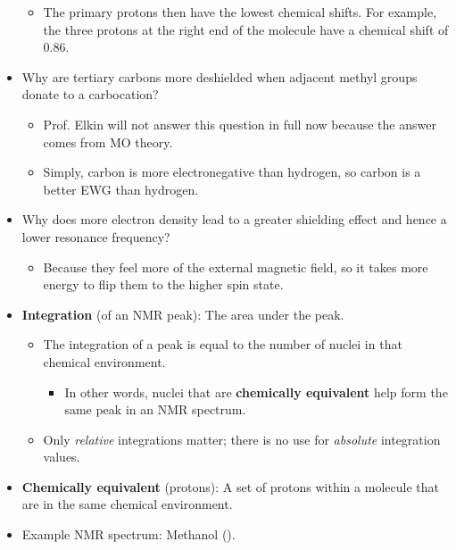 \documentclass[../notes.tex]{subfiles}
\begin{document}
\begin{itemize}
\begin{itemize}
        \item The primary protons then have the lowest chemical shifts. For example, the three protons at the right end of the molecule have a chemical shift of 0.86.
    \end{itemize}
    \item Why are tertiary carbons more deshielded when adjacent methyl groups donate to a carbocation?
    \begin{itemize}
        \item Prof. Elkin will not answer this question in full now because the answer comes from MO theory.
        \item Simply, carbon is more electronegative than hydrogen, so carbon is a better EWG than hydrogen.
    \end{itemize}
    \pagebreak
    \item Why does more electron density lead to a greater shielding effect and hence a lower resonance frequency?
    \begin{itemize}
        \item Because they feel more of the external magnetic field, so it takes more energy to flip them to the higher spin state.
    \end{itemize}
    \item \textbf{Integration} (of an NMR peak): The area under the peak.
    \begin{itemize}
        \item The integration of a peak is equal to the number of nuclei in that chemical environment.
        \begin{itemize}
            \item In other words, nuclei that are \textbf{chemically equivalent} help form the same peak in an NMR spectrum.
        \end{itemize}
        \item Only \emph{relative} integrations matter; there is no use for \emph{absolute} integration values.
    \end{itemize}
    \item \textbf{Chemically equivalent} (protons): A set of protons within a molecule that are in the same chemical environment.
    \item Example  NMR spectrum: Methanol ().
    \begin{figure}[h!]
        \centering
\end{figure}
\end{itemize}
\end{document}
